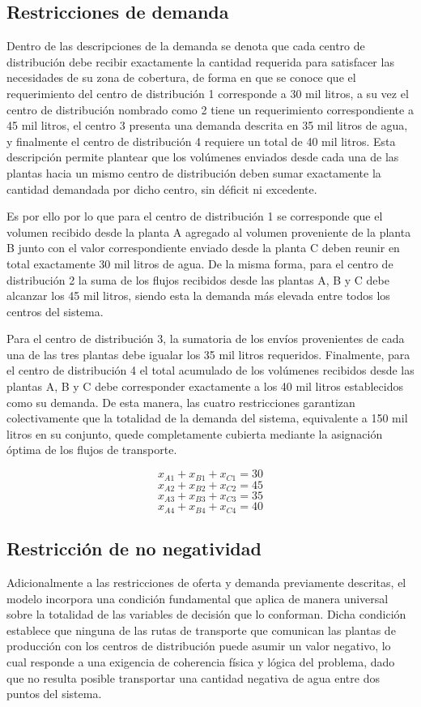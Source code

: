 \documentclass{article}
\begin{document}
	\subsection{Restricciones de demanda}
	
	
	Dentro de las descripciones de la demanda se denota que cada centro de distribución debe recibir exactamente la cantidad requerida para satisfacer las necesidades de su zona de cobertura, de forma en que se conoce que el requerimiento del centro de distribución 1 corresponde a 30 mil litros, a su vez el centro de distribución nombrado como 2 tiene un requerimiento correspondiente a 45 mil litros, el centro 3 presenta una demanda descrita en 35 mil litros de agua, y finalmente el centro de distribución 4 requiere un total de 40 mil litros. Esta descripción permite plantear que los volúmenes enviados desde cada una de las plantas hacia un mismo centro de distribución deben sumar exactamente la cantidad demandada por dicho centro, sin déficit ni excedente.
	
	Es por ello por lo que para el centro de distribución 1 se corresponde que el volumen recibido desde la planta A agregado al volumen proveniente de la planta B junto con el valor correspondiente enviado desde la planta C deben reunir en total exactamente 30 mil litros de agua. De la misma forma, para el centro de distribución 2 la suma de los flujos recibidos desde las plantas A, B y C debe alcanzar los 45 mil litros, siendo esta la demanda más elevada entre todos los centros del sistema.
	
	Para el centro de distribución 3, la sumatoria de los envíos provenientes de cada una de las tres plantas debe igualar los 35 mil litros requeridos. Finalmente, para el centro de distribución 4 el total acumulado de los volúmenes recibidos desde las plantas A, B y C debe corresponder exactamente a los 40 mil litros establecidos como su demanda. De esta manera, las cuatro restricciones garantizan colectivamente que la totalidad de la demanda del sistema, equivalente a 150 mil litros en su conjunto, quede completamente cubierta mediante la asignación óptima de los flujos de transporte.
	
	\[
	x_{A1} + x_{B1} + x_{C1} = 30
	\]
	\[
	x_{A2} + x_{B2} + x_{C2} = 45
	\]
	\[
	x_{A3} + x_{B3} + x_{C3} = 35
	\]
	\[
	x_{A4} + x_{B4} + x_{C4} = 40
	\]
	
	\subsection{Restricción de no negatividad}
	Adicionalmente a las restricciones de oferta y demanda previamente descritas, el modelo incorpora una condición fundamental que aplica de manera universal sobre la totalidad de las variables de decisión que lo conforman. Dicha condición establece que ninguna de las rutas de transporte que comunican las plantas de producción con los centros de distribución puede asumir un valor negativo, lo cual responde a una exigencia de coherencia física y lógica del problema, dado que no resulta posible transportar una cantidad negativa de agua entre dos puntos del sistema.
	
\end{document}
